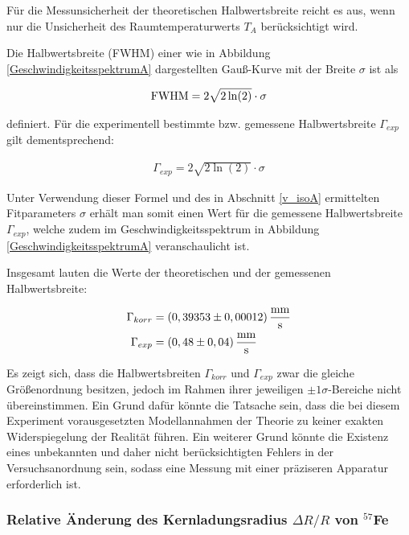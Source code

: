 \documentclass[
a4paper,                %
titlepage=firstiscover, %
captions=tableheading,  %
toc=bibliography,       %
toc=listof,             %
oneside,                %
automark,               %
12pt,                   %
english, ngerman,       %
parskip = half,         %
]{scrartcl}
\begin{document}
\noindent Für die Messunsicherheit der theoretischen Halbwertsbreite reicht es aus, wenn nur die Unsicherheit des Raumtemperaturwerts $T_{A}$ berücksichtigt wird.

Die Halbwertsbreite (FWHM) einer wie in Abbildung \ref{GeschwindigkeitsspektrumA} dargestellten Gauß-Kurve mit der Breite $\sigma$ ist als

\begin{align}
\textnormal{FWHM}=2\sqrt{2\ln (2)}\cdot\sigma
\end{align}

\noindent definiert.
Für die experimentell bestimmte bzw. gemessene Halbwertsbreite $\Gamma_{exp}$ gilt dementsprechend:

\begin{align}
\Gamma_{exp}=2\sqrt{2\ln (2)}\cdot\sigma
\end{align}

\noindent Unter Verwendung dieser Formel und des in Abschnitt \ref{v_isoA} ermittelten Fitparameters $\sigma$ erhält man somit einen Wert für die gemessene Halbwertsbreite $\Gamma_{exp}$, welche zudem im Geschwindigkeitsspektrum in Abbildung \ref{GeschwindigkeitsspektrumA} veranschaulicht ist.

Insgesamt lauten die Werte der theoretischen und der gemessenen Halbwertsbreite:

\begin{align*}
\Gamma_{korr} &= (0,39353\pm 0,00012)\,\frac{\textnormal{mm}}{\textnormal{s}} \\
\Gamma_{exp} &= (0,48\pm 0,04)\,\frac{\textnormal{mm}}{\textnormal{s}}
\end{align*}

\noindent Es zeigt sich, dass die Halbwertsbreiten $\Gamma_{korr}$ und $\Gamma_{exp}$ zwar die gleiche Größenordnung besitzen, jedoch im Rahmen ihrer jeweiligen $\pm 1\sigma$-Bereiche nicht übereinstimmen.
Ein Grund dafür könnte die Tatsache sein, dass die bei diesem Experiment vorausgesetzten Modellannahmen der Theorie zu keiner exakten Widerspiegelung der Realität führen.
Ein weiterer Grund könnte die Existenz eines unbekannten und daher nicht berücksichtigten Fehlers in der Versuchsanordnung sein, sodass eine Messung mit einer präziseren Apparatur erforderlich ist.


\subsubsection{Relative Änderung des Kernladungsradius $\Delta R/R$ von $^{57}$Fe} \label{A:dRR}
\end{document}
